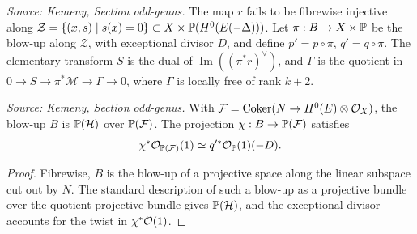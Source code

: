 \begin{definition}
  \label{def:kemeny_odd_blowup_elementary_transform}
  \textit{Source: Kemeny, Section odd-genus.}
  The map \(r\) fails to be fibrewise injective along
  \(\mathcal Z=\{(x,s)\mid s(x)=0\}\subset X\times\mathbb{P}(H^0(E(-\Delta)))\).  Let
  \(\pi:B\to X\times\mathbb{P}\) be the blow-up along \(\mathcal Z\), with exceptional
  divisor \(D\), and define \(p'=p\circ\pi\), \(q'=q\circ\pi\).  The elementary
  transform \(S\) is the dual of \(\operatorname{Im}((\pi^*r)^\vee)\), and
  \(\Gamma\) is the quotient in \(0\to S\to\pi^*\mathcal M\to\Gamma\to0\), where
  \(\Gamma\) is locally free of rank \(k+2\).
\end{definition}

\begin{lemma}
  \label{lem:kemeny_odd_projective_bundle_model}
  \textit{Source: Kemeny, Section odd-genus.}
  With \(\mathcal F=\operatorname{Coker}(N\to H^0(E)\otimes\mathcal{O}_X)\), the blow-up
  \(B\) is \(\mathbb{P}(\mathcal H)\) over \(\mathbb{P}(\mathcal F)\).  The projection
  \(\chi:B\to\mathbb{P}(\mathcal F)\) satisfies
  \[
    \chi^*\mathcal{O}_{\mathbb{P}(\mathcal F)}(1)\simeq q'^*\mathcal{O}_{\mathbb{P}}(1)(-D).
  \]
\end{lemma}
\begin{proof}
  Fibrewise, \(B\) is the blow-up of a projective space along the linear subspace
  cut out by \(N\).  The standard description of such a blow-up as a projective
  bundle over the quotient projective bundle gives \(\mathbb{P}(\mathcal H)\), and the
  exceptional divisor accounts for the twist in \(\chi^*\mathcal{O}(1)\).
\end{proof}

